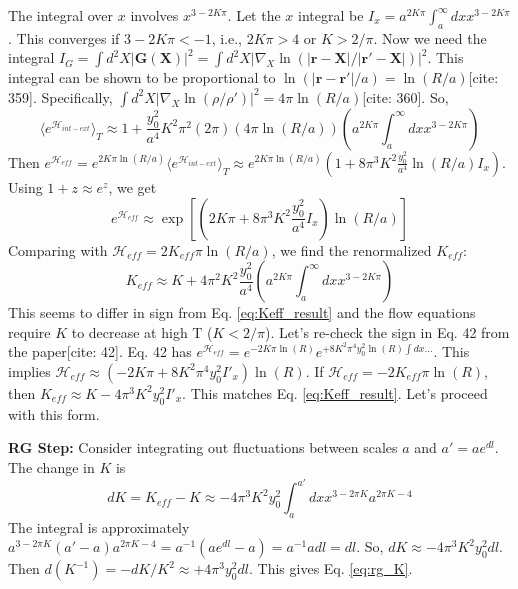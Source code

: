 \documentclass[11pt]{article}
\begin{document}
The integral over $x$ involves $x^{3-2K\pi}$. Let the $x$ integral be $I_x = a^{2K\pi} \int_a^\infty dx x^{3-2K\pi}$. This converges if $3-2K\pi < -1$, i.e., $2K\pi > 4$ or $K > 2/\pi$.
Now we need the integral $I_G = \int d^2X |\mathbf{G}(\mathbf{X})|^2 = \int d^2X |\nabla_X \ln(|\mathbf{r}-\mathbf{X}|/|\mathbf{r}'-\mathbf{X}|)|^2$. This integral can be shown to be proportional to $\ln(|\mathbf{r}-\mathbf{r}'|/a) = \ln(R/a)$[cite: 359]. Specifically, $\int d^2X |\nabla_X \ln(\rho/\rho')|^2 = 4\pi \ln(R/a)$[cite: 360].
So,
\begin{equation}
\langle e^{\mathcal{H}_{int-ext}} \rangle_T \approx 1 + \frac{y_0^2}{a^4} K^2 \pi^2 (2\pi) (4\pi \ln(R/a)) (a^{2K\pi} \int_a^\infty dx x^{3-2K\pi})
\end{equation}
Then $e^{\mathcal{H}_{eff}} = e^{2K\pi \ln(R/a)} \langle e^{\mathcal{H}_{int-ext}} \rangle_T \approx e^{2K\pi \ln(R/a)} (1 + 8 \pi^3 K^2 \frac{y_0^2}{a^4} \ln(R/a) I_x)$.
Using $1+z \approx e^z$, we get
\begin{equation}
e^{\mathcal{H}_{eff}} \approx \exp\left[ \left( 2K\pi + 8 \pi^3 K^2 \frac{y_0^2}{a^4} I_x \right) \ln(R/a) \right] \label{eq:app_Heff_final}
\end{equation}
Comparing with $\mathcal{H}_{eff} = 2K_{eff}\pi \ln(R/a)$, we find the renormalized $K_{eff}$:
\begin{equation}
K_{eff} \approx K + 4 \pi^2 K^2 \frac{y_0^2}{a^4} (a^{2K\pi} \int_a^\infty dx x^{3-2K\pi})
\end{equation}
This seems to differ in sign from Eq. \eqref{eq:Keff_result} and the flow equations require $K$ to decrease at high T ($K<2/\pi$). Let's re-check the sign in Eq. 42 from the paper[cite: 42]. Eq. 42 has $e^{\mathcal{H}_{eff}} = e^{-2K\pi \ln(R)} e^{+8 K^2 \pi^4 y_0^2 \ln(R) \int dx \dots}$. This implies $\mathcal{H}_{eff} \approx (-2K\pi + 8 K^2 \pi^4 y_0^2 I'_x) \ln(R)$. If $\mathcal{H}_{eff} = -2K_{eff}\pi \ln(R)$, then $K_{eff} \approx K - 4 \pi^3 K^2 y_0^2 I'_x$. This matches Eq. \eqref{eq:Keff_result}. Let's proceed with this form.

\textbf{RG Step:}
Consider integrating out fluctuations between scales $a$ and $a' = a e^{dl}$. The change in $K$ is
\begin{equation}
dK = K_{eff} - K \approx - 4 \pi^3 K^2 y_0^2 \int_a^{a'} dx x^{3-2\pi K} a^{2\pi K - 4}
\end{equation}
The integral is approximately $a^{3-2\pi K} (a'-a) a^{2\pi K - 4} = a^{-1} (a e^{dl} - a) = a^{-1} a dl = dl$.
So, $dK \approx - 4 \pi^3 K^2 y_0^2 dl$.
Then $d(K^{-1}) = -dK/K^2 \approx + 4 \pi^3 y_0^2 dl$. This gives Eq. \eqref{eq:rg_K}.
\end{document}
